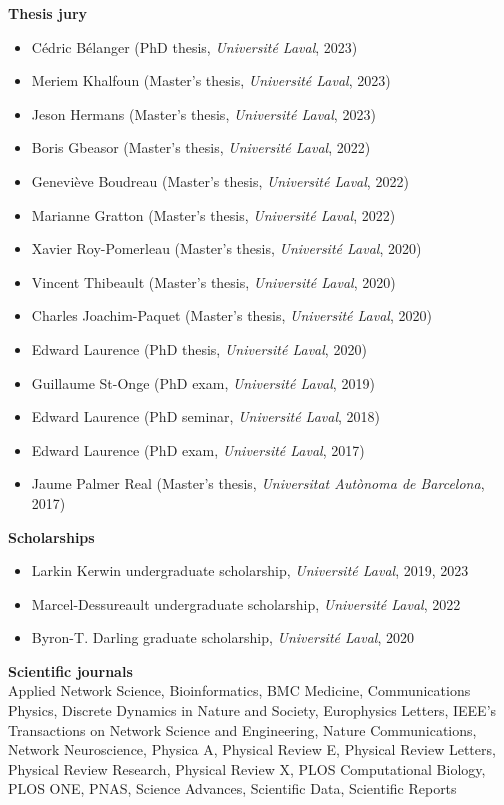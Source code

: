 \documentclass[11pt]{article}
\begin{document}
%
%
%
\textbf{Thesis jury}
%
\begin{itemize}\small
  \item Cédric Bélanger (PhD thesis, \textit{Universit\'e Laval}, 2023)
  \item Meriem Khalfoun (Master's thesis, \textit{Universit\'e Laval}, 2023)
  \item Jeson Hermans (Master's thesis, \textit{Universit\'e Laval}, 2023)
  \item Boris Gbeasor (Master's thesis, \textit{Universit\'e Laval}, 2022)
  \item Geneviève Boudreau (Master's thesis, \textit{Universit\'e Laval}, 2022)
  \item Marianne Gratton (Master's thesis, \textit{Universit\'e Laval}, 2022)
  \item Xavier Roy-Pomerleau (Master's thesis, \textit{Universit\'e Laval}, 2020)
  \item Vincent Thibeault (Master's thesis, \textit{Universit\'e Laval}, 2020)
  \item Charles Joachim-Paquet (Master's thesis, \textit{Universit\'e Laval}, 2020)
  \item Edward Laurence (PhD thesis, \textit{Universit\'e Laval}, 2020)
  \item Guillaume St-Onge (PhD exam, \textit{Universit\'e Laval}, 2019)
  \item Edward Laurence (PhD seminar, \textit{Universit\'e Laval}, 2018)
  \item Edward Laurence (PhD exam, \textit{Universit\'e Laval}, 2017)
  \item Jaume Palmer Real (Master's thesis, \textit{Universitat Aut\`onoma de Barcelona}, 2017)
\end{itemize}
%
%
%
\textbf{Scholarships}
%
\begin{itemize}\small
  \item Larkin Kerwin undergraduate scholarship, \textit{Universit\'e Laval}, 2019, 2023
  \item Marcel-Dessureault undergraduate scholarship, \textit{Université Laval}, 2022
  \item Byron-T. Darling graduate scholarship, \textit{Universit\'e Laval}, 2020
\end{itemize}
%
%
%
\parbox{\textwidth}{\textbf{Scientific journals}\\\small
%
Applied Network Science, %
Bioinformatics, %
BMC Medicine, %
Communications Physics, %
Discrete Dynamics in Nature and Society, %
Europhysics Letters, %
IEEE's Transactions on Network Science and Engineering, %
Nature Communications, %
Network Neuroscience, %
Physica A, %
Physical Review E, %
Physical Review Letters, %
Physical Review Research, %
Physical Review X, %
PLOS Computational Biology, %
PLOS ONE, %
PNAS, %
Science Advances, %
Scientific Data, %
Scientific Reports%
} \vspace{1.75\baselineskip} \\
\end{document}
